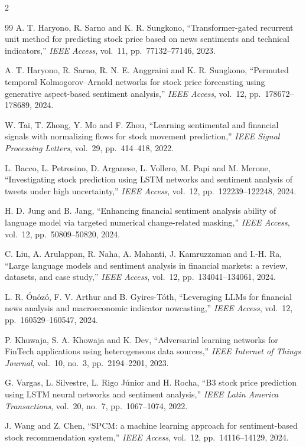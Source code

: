 \begin{footnotesize}
\begin{multicols}{2}
\begin{thebibliography}{99}
 A. T. Haryono, R. Sarno and K. R. Sungkono, ``Transformer-gated
recurrent unit method for predicting stock price based on news sentiments and technical
indicators,'' \emph{IEEE Access}, vol.~11, pp.~77132--77146, 2023.

 A. T. Haryono, R. Sarno, R. N. E. Anggraini and K. R. Sungkono,
``Permuted temporal Kolmogorov--Arnold networks for stock price forecasting using
generative aspect-based sentiment analysis,'' \emph{IEEE Access}, vol.~12,
pp.~178672--178689, 2024.

 W. Tai, T. Zhong, Y. Mo and F. Zhou, ``Learning sentimental and
financial signals with normalizing flows for stock movement prediction,'' \emph{IEEE
Signal Processing Letters}, vol.~29, pp.~414--418, 2022.

 L. Bacco, L. Petrosino, D. Arganese, L. Vollero, M. Papi and
M. Merone, ``Investigating stock prediction using LSTM networks and sentiment analysis of
tweets under high uncertainty,'' \emph{IEEE Access}, vol.~12, pp.~122239--122248, 2024.

 H. D. Jung and B. Jang, ``Enhancing financial sentiment analysis
ability of language model via targeted numerical change-related masking,'' \emph{IEEE
Access}, vol.~12, pp.~50809--50820, 2024.

 C. Liu, A. Arulappan, R. Naha, A. Mahanti, J. Kamruzzaman and
I.-H. Ra, ``Large language models and sentiment analysis in financial markets: a review,
datasets, and case study,'' \emph{IEEE Access}, vol.~12, pp.~134041--134061, 2024.

 L. R. \'On\'oz\'o, F. V. Arthur and B. Gyires-T\'oth, ``Leveraging
LLMs for financial news analysis and macroeconomic indicator nowcasting,'' \emph{IEEE
Access}, vol.~12, pp.~160529--160547, 2024.

 P. Khuwaja, S. A. Khowaja and K. Dev, ``Adversarial learning
networks for FinTech applications using heterogeneous data sources,'' \emph{IEEE Internet
of Things Journal}, vol.~10, no.~3, pp.~2194--2201, 2023.

 G. Vargas, L. Silvestre, L. Rigo J\'unior and H. Rocha, ``B3 stock
price prediction using LSTM neural networks and sentiment analysis,'' \emph{IEEE Latin
America Transactions}, vol.~20, no.~7, pp.~1067--1074, 2022.

 J. Wang and Z. Chen, ``SPCM: a machine learning approach for
sentiment-based stock recommendation system,'' \emph{IEEE Access}, vol.~12,
pp.~14116--14129, 2024.


\end{thebibliography}
\end{multicols}
\end{footnotesize}
